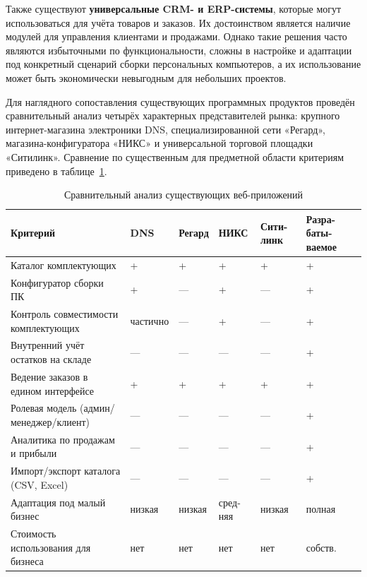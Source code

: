 \documentclass[14pt, a4paper]{extarticle}
\begin{document}
Также существуют \textbf{универсальные CRM- и ERP-системы}, которые могут использоваться для учёта товаров и заказов. Их достоинством является наличие модулей для управления клиентами и продажами. Однако такие решения часто являются избыточными по функциональности, сложны в настройке и адаптации под конкретный сценарий сборки персональных компьютеров, а их использование может быть экономически невыгодным для небольших проектов.

Для наглядного сопоставления существующих программных продуктов проведён сравнительный анализ четырёх характерных представителей рынка: крупного интернет-магазина электроники DNS, специализированной сети «Регард», магазина-конфигуратора «НИКС» и универсальной торговой площадки «Ситилинк». Сравнение по существенным для предметной области критериям приведено в таблице~\ref{tab:competitors}.

\begin{table}[ht!]
\caption{Сравнительный анализ существующих веб-приложений}
\label{tab:competitors}
\footnotesize
\begin{tabularx}{\textwidth}{|>{\RaggedRight\arraybackslash}p{}|>{\centering\arraybackslash}X|>{\centering\arraybackslash}X|>{\centering\arraybackslash}X|>{\centering\arraybackslash}X|>{\centering\arraybackslash}X|}
\hline
\textbf{Критерий} & \textbf{DNS} & \textbf{Регард} & \textbf{НИКС} & \textbf{Сити-линк} & \textbf{Разра-баты-ваемое} \\ \hline
Каталог комплектующих & + & + & + & + & + \\ \hline
Конфигуратор сборки ПК & + & --- & + & --- & + \\ \hline
Контроль совместимости комплектующих & частично & --- & + & --- & + \\ \hline
Внутренний учёт остатков на складе & --- & --- & --- & --- & + \\ \hline
Ведение заказов в едином интерфейсе & + & + & + & + & + \\ \hline
Ролевая модель (админ/менеджер/клиент) & --- & --- & --- & --- & + \\ \hline
Аналитика по продажам и прибыли & --- & --- & --- & --- & + \\ \hline
Импорт/экспорт каталога (CSV, Excel) & --- & --- & --- & --- & + \\ \hline
Адаптация под малый бизнес & низкая & низкая & сред-няя & низкая & полная \\ \hline
Стоимость использования для бизнеса & нет & нет & нет & нет & собств. \\ \hline
\end{tabularx}
\end{table}
\end{document}
